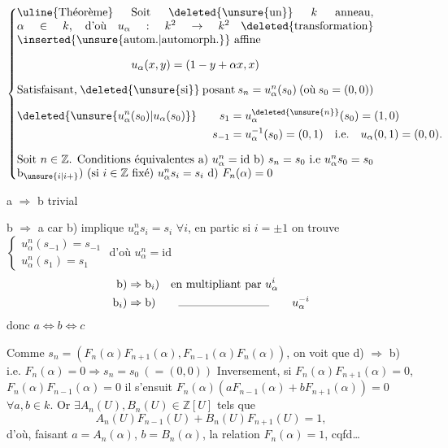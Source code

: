 \noindent\(\left\{\vcenter{\hbox{\begin{minipage}{.91\linewidth}
\uline{Théorème} Soit \deleted{\unsure{un}} $k$ anneau, $\alpha\in k$, d'où $u_\alpha:k^{2}\to k^2$
\deleted{transformation} \inserted{\unsure{autom.|automorph.}} affine
\[
u_\alpha(x,y)=(1-y+\alpha x,x)
\]
Satisfaisant, \deleted{\unsure{si}} posant $s_n=u_\alpha^n(s_0)$ (où $s_0=(0,0)$)
\[
\begin{aligned}
\deleted{\unsure{u_\alpha^n(s_0)|u_\alpha(s_0)}}\qquad s_1&=u_\alpha^{\deleted{\unsure{n}}}(s_0)=(1,0)\\
s_{-1}&=u_\alpha^{-1}(s_0)=(0,1)\quad\text{i.e.}\quad u_\alpha(0,1)=(0,0).
\end{aligned}
\]
Soit $n\in\mathbb Z$. Conditions équivalentes

a) $u_\alpha^n=\mathrm{id}$

b) $s_n=s_0$ i.e $u_\alpha^ns_0=s_0$

b$_{\unsure{i|i+}}$) (si $i\in\mathbb Z$ fixé) $u_\alpha^ns_i=s_i$

d) $F_n(\alpha)=0$
\end{minipage}}}\right.\)

a $\Rightarrow$ b trivial

b $\Rightarrow$ a car b) implique  $u_\alpha^ns_i=s_i$ $\forall i$, en
partic si $i=\pm1$ on trouve $\begin{cases}u_\alpha^n(s_{-1})=s_{-1}\\u_\alpha^n(s_1)=s_1\end{cases}$
d'où $u_\alpha^n=\mathrm{id}$
\[
\begin{aligned}
\text{b)}&\Rightarrow\text{b}_i\text{)}\quad\text{en multipliant par }u_\alpha^i\\
\text{b}_i\text{)}&\Rightarrow\text{b)}\qquad\rule{2.8cm}{.3pt}\qquad u_\alpha^{-i}
\end{aligned}
\]
donc $a\Longleftrightarrow b\Longleftrightarrow c$

Comme $s_n=(F_n(\alpha)F_{n+1}(\alpha),F_{n-1}(\alpha)F_n(\alpha))$, on voit
que d) $\Rightarrow$ b) i.e. $F_n(\alpha)=0\Rightarrow s_n=s_0\ (=(0,0))$
Inversement, si $F_n(\alpha)F_{n+1}(\alpha)=0$, $F_n(\alpha)F_{n-1}(\alpha)=0$ 
il s'ensuit $F_n(\alpha)(a F_{n-1}(\alpha)+b F_{n+1}(\alpha))=0$ $\forall a,b\in k$.
Or $\exists A_n(U),B_n(U)\in\mathbb Z[U]$ tels que
\[
A_n(U)F_{n-1}(U)+B_n(U)F_{n+1}(U)=1,
\]
d'où, faisant $a=A_n(\alpha)$, $b=B_n(\alpha)$, la relation $F_n(\alpha)=1$,
cqfd\ldots
